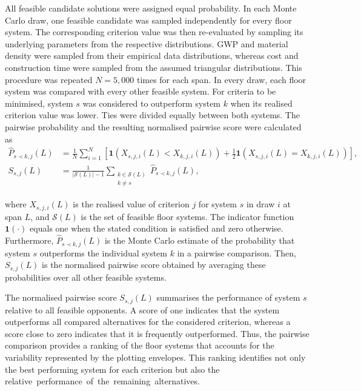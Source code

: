 All feasible candidate solutions were assigned equal probability. In each Monte Carlo draw, one feasible candidate was sampled independently for every floor system. The corresponding criterion value was then re-evaluated by sampling its underlying parameters from the respective distributions. GWP and material density were sampled from their empirical data distributions, whereas cost and construction time were sampled from the assumed triangular distributions. This procedure was repeated $N=5{,}000$ times for each span. In every draw, each floor system was compared with every other feasible system. For criteria to be minimised, system $s$ was considered to outperform system $k$ when its realised criterion value was lower. Ties were divided equally between both systems. The pairwise probability and the resulting normalised pairwise score were calculated as
\begin{equation}
\begin{aligned}
    \widehat{P}_{s \prec k,j}(L)
    &=
    \frac{1}{N}
    \sum_{i=1}^{N}
    \left[
        \mathbf{1}
        \left(
            X_{s,j,i}(L)<X_{k,j,i}(L)
        \right)
        +
        \frac{1}{2}
        \mathbf{1}
        \left(
            X_{s,j,i}(L)=X_{k,j,i}(L)
        \right)
    \right],
    \\
    S_{s,j}(L)
    &=
    \frac{1}{|\mathcal{S}(L)|-1}
    \sum_{\substack{k\in\mathcal{S}(L)\\k\neq s}}
    \widehat{P}_{s \prec k,j}(L),
\end{aligned}
\label{eq:pairwise_score}
\end{equation}

where $X_{s,j,i}(L)$ is the realised value of criterion $j$ for system $s$ in draw $i$ at span $L$, and $\mathcal{S}(L)$ is the set of feasible floor systems. The indicator function $\mathbf{1}(\cdot)$ equals one when the stated condition is satisfied and zero otherwise. Furthermore, $\widehat{P}_{s \prec k,j}(L)$ is the Monte Carlo estimate of the probability that system $s$ outperforms the individual system $k$ in a pairwise comparison. Then, $S_{s,j}(L)$ is the normalised pairwise score obtained by averaging these probabilities over all other feasible systems.

The normalised pairwise score $S_{s,j}(L)$ summarises the performance of system $s$ relative to all feasible opponents. A score of one indicates that the system outperforms all compared alternatives for the considered criterion, whereas a score close to zero indicates that it is frequently outperformed. Thus, the pairwise comparison provides a ranking of the floor systems that accounts for the variability represented by the plotting envelopes. This ranking identifies not only the best performing system for each criterion but also the \mbox{relative performance of the remaining alternatives.}

